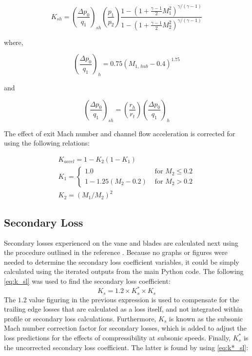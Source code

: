 \documentclass[12pt, letter]{report}
\begin{document}
\begin{equation}
    \label{eq:k_sh}
            K_{sh} = {\left( \frac{\Delta p_0}{q_1}\right)}_{sh}  \left( \frac{p_1}{p_2}\right)  \frac{   1 -      {\left(   1 + \frac{\gamma-1}{2} M_1^2 \right)}^{\gamma/(\gamma-1)}}{1 - {\left(  1 + \frac{\gamma-1}{2} M_2^2 \right)}^{\gamma/(\gamma-1)}}      
\end{equation}

where,

$${\left( \frac{\Delta p_0}{q_1}\right) }_h = 0.75(M_{1, \, hub} - 0.4)^{1.75}$$

and

$${\left( \frac{\Delta p_0}{q_1}\right)}_{sh} = \left( \frac{r_h}{r_t} \right){\left( \frac{\Delta p_0}{q_1}\right) }_h$$

\vspace{20pt}
The effect of exit Mach number and channel flow acceleration is corrected for using the following relations:

\begin{equation}
    \label{eq:k_accel}
    \begin{aligned}
        K_{accel} = 1 - K_2 (1-K_1) \\
        K_1= \begin{cases}1.0 & \text { for } M_2 \leq 0.2 \\ 1-1.25\left(M_2-0.2\right) & \text { for } M_2>0.2\end{cases} \\
        K_2 = (M_1/M_2)^2
    \end{aligned}
\end{equation}


\subsection{Secondary Loss}

Secondary losses experienced on the vane and blades are calculated next using the procedure outlined in the reference \cite{moustapha2003}. Because no graphs or figures were needed to determine the secondary loss coefficient variables, it could be simply calculated using the iterated outputs from the main Python code. The following \autoref{eq:k_sl} was used to find the secondary loss coefficient:
\begin{equation}
\label{eq:k_sl}
    K_s = 1.2 \times K^*_s \times K_s
\end{equation}
\indent The \textit{$1.2$} value figuring in the previous expression is used to compensate for the trailing edge losses that are calculated as a loss itself, and not integrated within profile or secondary loss calculations. Furthermore, $K_s$ is known as the subsonic Mach number correction factor for secondary losses, which is added to adjust the loss predictions for the effects of compressibility at subsonic speeds. Finally, $K^*_s$ is the uncorrected secondary loss coefficient. The latter is found by using \autoref{eq:k*_sl}:
\end{document}
